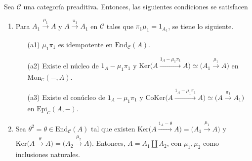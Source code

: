 \documentclass[tesis]{subfiles}
\begin{document}
\begin{Prop}\label{Mendoza-1.9.16}
    Sea $\mathscr{C}$ una categoría preaditiva. Entonces, las siguientes condiciones se satisfacen
    \begin{enumerate}[label=(\alph*)]
    
        \item Para $A_1\xrightarrow[]{\mu_1}A$ y $A\xrightarrow[]{\pi_1}A_1$ en $\mathscr{C}$ tales que $\pi_1\mu_1=1_{A_1}$, se tiene lo siguiente.

            \begin{itemize}
            
                \item[(a1)] $\mu_1\pi_1$ es idempotente en $\text{End}_\mathscr{C}(A)$.

                \item[(a2)] Existe el núcleo de $1_A-\mu_1\pi_1$ y $\text{Ker}\big( A\xrightarrow[]{1_A-\mu_1\pi_1} A\big) \simeq \big( A_1\xrightarrow[]{\mu_1} A\big)$ en $\text{Mon}_\mathscr{C}(-,A)$.

                \item[(a3)] Existe el conúcleo de $1_A-\mu_1\pi_1$ y $\text{CoKer}\big( A\xrightarrow[]{1_A-\mu_1\pi_1} A\big) \simeq \big( A\xrightarrow[]{\pi_1} A_1\big)$ en $\text{Epi}_\mathscr{C}(A,-)$.
            \end{itemize}

        \item Sea $\theta^2=\theta\in\text{End}_\mathscr{C}(A)$ tal que existen $\text{Ker}\big(A\xrightarrow[]{1_A-\theta}A\big) = \big(A_1\xrightarrow[]{\mu_1}A \big)$ y $\text{Ker}\big(A\xrightarrow[]{\theta}A \big) = \big(A_2\xrightarrow[]{\mu_2} A\big)$. Entonces, $A=A_1\coprod A_2$, con $\mu_1, \mu_2$ como inclusiones naturales.
    \end{enumerate}
\end{Prop}
\end{document}
